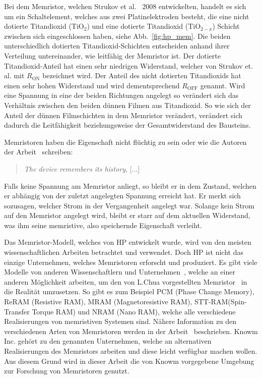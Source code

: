 Bei dem Memristor, welchen Strukov et al.~\cite{hp_2008} 2008 entwickelten, handelt es sich um ein Schaltelement, welches aus zwei Platinelektroden besteht, die eine nicht dotierte Titandioxid (TiO$_2$) und eine dotierte Titandioxid (TiO$_{2-x}$) Schicht zwischen sich eingeschlossen haben, siehe Abb.~\ref{fig:hp_mem}. Die beiden unterschiedlich dotierten Titandioxid-Schichten entscheiden anhand ihrer Verteilung untereinander, wie leitfähig der Memristor ist. Der dotierte Titandioxid-Anteil hat einen sehr niedrigen Widerstand, welcher von Strukov et. al. mit $R_{\text{ON}}$ bezeichnet wird. Der Anteil des nicht dotierten Titandioxids hat einen sehr hohen Widerstand und wird dementsprechend $R_{\text{OFF}}$ genannt. Wird eine Spannung in eine der beiden Richtungen angelegt so verändert sich das Verhältnis zwischen den beiden dünnen Filmen aus Titandioxid. So wie sich der Anteil der dünnen Filmschichten in dem Memristor verändert, verändert sich dadurch die Leitfähigkeit beziehungsweise der Gesamtwiderstand des Bausteins.

Memristoren haben die Eigenschaft nicht flüchtig zu sein oder wie die Autoren der Arbeit~\cite{vde_memristor} schreiben:
\begin{quote}
  \textit{The device remembers its history}, [...]
\end{quote}
Falls keine Spannung am Memristor anliegt, so bleibt er in dem Zustand, welchen er abhängig von der zuletzt angelegten Spannung erreicht hat. Er merkt sich sozusagen, welcher Strom in der Vergangenheit angelegt war. Solange kein Strom auf den Memristor angelegt wird, bleibt er starr auf dem aktuellen Widerstand, was ihm seine memristive, also speichernde Eigenschaft verleiht.



Das Memristor-Modell, welches von HP entwickelt wurde, wird von den meisten wissenschaftlichen Arbeiten betrachtet und verwendet. Doch HP ist nicht das einzige Unternehmen, welches Memristoren erforscht und produziert. Es gibt viele Modelle von anderen Wissenschaftlern und Unternehmen~\cite{team_model,elec_model,spice_model}, welche an einer anderen Möglichkeit arbeiten, um den von L.Chua vorgestellten Memristor~\cite{chua_mem} in die Realität umzusetzen. So gibt es zum Beispiel PCM (Phase Change Memory), ReRAM (Resistive RAM), MRAM (Magnetoresistive RAM), STT-RAM(Spin-Transfer Torque RAM) und NRAM (Nano RAM), welche alle verschiedene Realisierungen von memristiven Systemen sind. Nähere Information zu den verschiedenen Arten von Memristoren werden in der Arbeit~\cite{vde_memristor} beschrieben. Knowm Inc. gehört zu den genannten Unternehmen, welche an alternativen Realisierungen des Memristors arbeiten und diese leicht verfügbar machen wollen. Aus diesem Grund wird in dieser Arbeit die von Knowm vorgegebene Umgebung zur Forschung von Memristoren genutzt.

